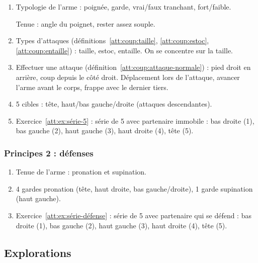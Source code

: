\begin{enumerate}


	\item Typologie de l'arme : poignée, garde, vrai/faux tranchant, fort/faible.
	
	Tenue : angle du poignet, rester assez souple.

	\item Types d'attaques (définitions~\ref{att:coup:taille}, \ref{att:coup:estoc}, \ref{att:coup:entaille}) : taille, estoc, entaille.
	On se concentre sur la taille.
	
	\item Effectuer une attaque (définition~\ref{att:coup:attaque-normale}) : pied droit en arrière, coup depuis le côté droit.
	Déplacement lors de l'attaque, avancer l'arme avant le corps, frappe avec le dernier tiers.
	
	\item 5 cibles : tête, haut/bas gauche/droite (attaques descendantes).
	
	\item Exercice~\ref{att:ex:série-5} : série de 5 avec partenaire immobile : bas droite (1), bas gauche (2), haut gauche (3), haut droite (4), tête (5).
\end{enumerate}


\subsubsection{Principes 2 : défenses}


\begin{enumerate}
	\item Tenue de l'arme : pronation et supination.

	\item 4 gardes pronation (tête, haut droite, bas gauche/droite), 1 garde supination (haut gauche).
	
	\item Exercice~\ref{att:ex:série-défense} : série de 5 avec partenaire qui se défend : bas droite (1), bas gauche (2), haut gauche (3), haut droite (4), tête (5).
\end{enumerate}


\subsection{Explorations}


